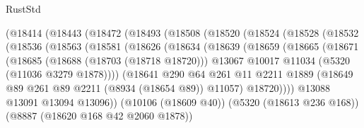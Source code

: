 \begin{lexlean}{RustStd}
\begin{coremodule}
                    (@18414
                      (@18443
                        (@18472
                          (@18493
                            (@18508
                              (@18520
                                (@18524
                                  (@18528
                                    (@18532
                                      (@18536
                                        (@18563
                                          (@18581
                                            (@18626
                                              (@18634
                                                (@18639
                                                  (@18659
                                                    (@18665
                                                      (@18671
                                                        (@18685
                                                          (@18688 (@18703 (@18718 @18720)))
                                                          @13067
                                                          @10017
                                                          @11034
                                                          (@5320 (@11036 @3279 @1878))))
                                                      (@18641
                                                        @290
                                                        @64
                                                        @261
                                                        @11
                                                        @2211
                                                        @1889
                                                        (@18649
                                                          @89
                                                          @261
                                                          @89
                                                          @2211
                                                          (@8934 (@18654 @89))
                                                          @11057)
                                                        @18720))))
                                                @13088
                                                @13091
                                                @13094
                                                @13096))
                                            (@10106 (@18609 @40))
                                            (@5320 (@18613 @236 @168))
                                            (@8887 (@18620 @168 @42 @2060 @1878))

\end{coremodule}
\end{lexlean}
